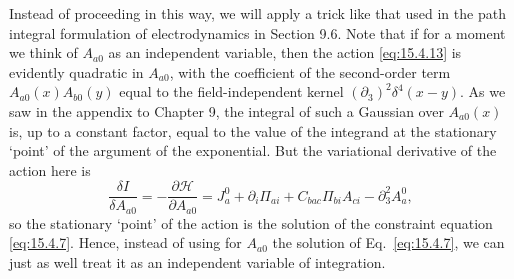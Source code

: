 Instead of proceeding in this way, we will apply a trick like that used in the
path integral formulation of electrodynamics in Section 9.6. Note that if for
a moment we think of $A_{a0}$ as an independent variable, then the action
\eqref{eq:15.4.13} is evidently quadratic in $A_{a0}$, with the
coefficient of the second-order term $A_{a0}(x)A_{b0}(y)$ equal to the
field-independent kernel $(\partial_3)^2\delta^4(x-y)$. As we saw in the
appendix to Chapter 9, the integral of such a Gaussian over $A_{a0}(x)$
is, up to a constant factor, equal to the value of the integrand at the
stationary `point' of the argument of the exponential. But the variational
derivative of the action here is
\begin{equation*}
  \frac{\delta I}{\delta A_{a0}}
  =-\frac{\partial\mathcal H}{\partial A_{a0}}
  =J_a^0+\partial_i\Pi_{a i}
  +C_{bac}\Pi_{b i}A_{c i}
  -\partial_3^2A_a^0,
\end{equation*}
so the stationary `point' of the action is the solution of the constraint
equation \eqref{eq:15.4.7}. Hence, instead of using for $A_{a0}$ the
solution of Eq.~\eqref{eq:15.4.7}, we can just as well treat it as an
independent variable of integration.

